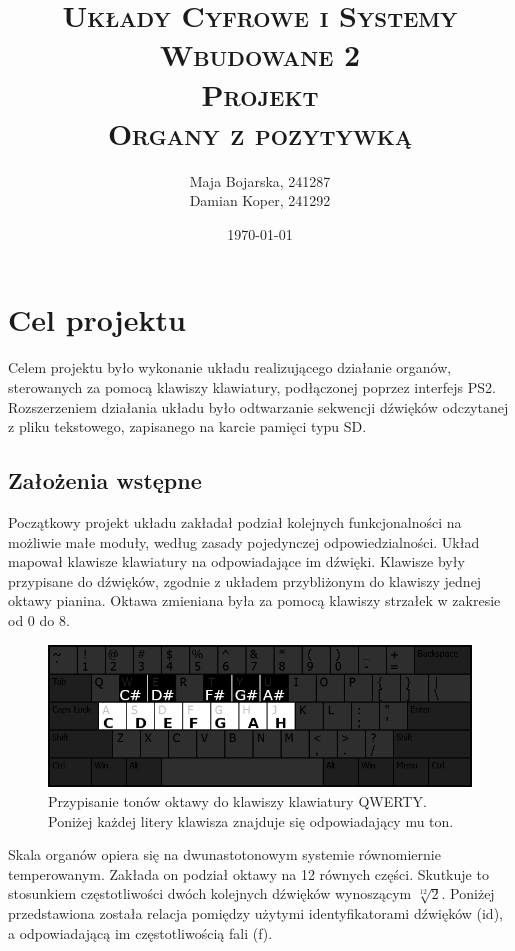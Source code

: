 \documentclass[a4paper,12pt]{article}
\title{ 
    \vspace*{50mm}
    \textsc{
        \textbf{Układy Cyfrowe i Systemy Wbudowane 2}\\
        \large Projekt \\
         Organy z pozytywką
    }
}
\author{
Maja Bojarska, 241287\\
Damian Koper,  241292\\
}
\date{\today}
\begin{document}
\maketitle

\clearpage

\setcounter{tocdepth}{2}
\tableofcontents

\clearpage

\section{Cel projektu}

Celem projektu było wykonanie układu realizującego działanie organów, sterowanych za pomocą klawiszy klawiatury, podłączonej poprzez interfejs PS2. Rozszerzeniem działania układu było odtwarzanie sekwencji dźwięków odczytanej z pliku tekstowego, zapisanego na karcie pamięci typu SD.

\subsection{Założenia wstępne}

Początkowy projekt układu zakładał podział kolejnych funkcjonalności na możliwie małe moduły, według zasady pojedynczej odpowiedzialności. Układ mapował klawisze klawiatury na odpowiadające im dźwięki. Klawisze były przypisane do dźwięków, zgodnie z układem przybliżonym do klawiszy jednej oktawy pianina.  Oktawa zmieniana była za pomocą klawiszy strzałek w zakresie od 0 do 8.

\begin{figure}[h]
  \centering
  \includegraphics[width=\linewidth]{images/key_mapping.png}
  \caption{Przypisanie tonów oktawy do klawiszy klawiatury QWERTY. Poniżej każdej litery klawisza znajduje się odpowiadający mu ton.}
  \label{key_mapping}
\end{figure}

Skala organów opiera się na dwunastotonowym systemie równomiernie temperowanym. Zakłada on podział oktawy na 12 równych części. Skutkuje to stosunkiem częstotliwości dwóch kolejnych dźwięków wynoszącym \(\sqrt[12]{2}\). Poniżej przedstawiona została relacja pomiędzy użytymi identyfikatorami dźwięków (id), a odpowiadającą im częstotliwością fali (f).
\end{document}
